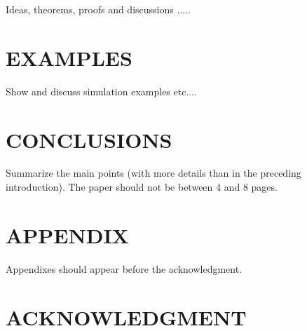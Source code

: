 \documentclass[letterpaper, 10 pt, conference]{ieeeconf}  %
\begin{document}
Ideas, theorems, proofs and discussions .....


\section{EXAMPLES}\label{examples}

Show and discuss simulation examples etc....



\section{CONCLUSIONS}

Summarize the main points (with more details than in the preceding introduction).
The paper should not be between 4 and 8 pages.



\addtolength{\textheight}{-12cm}   %



\section*{APPENDIX}

Appendixes should appear before the acknowledgment.

\section*{ACKNOWLEDGMENT}






\end{document}

